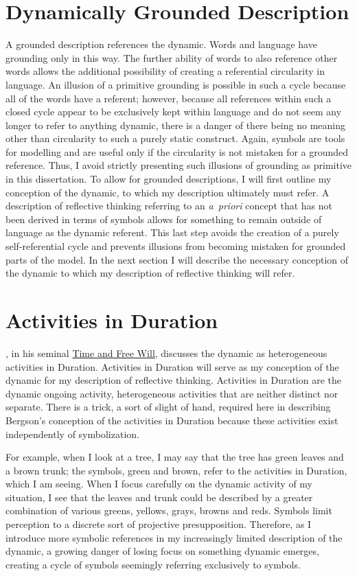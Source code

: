 \section{Dynamically Grounded Description}

A grounded description references the dynamic.  Words and language
have grounding only in this way.  The further ability of words to also
reference other words allows the additional possibility of creating a
referential circularity in language.  An illusion of a primitive
grounding is possible in such a cycle because all of the words have a
referent; however, because all references within such a closed cycle
appear to be exclusively kept within language and do not seem any
longer to refer to anything dynamic, there is a danger of there being
no meaning other than circularity to such a purely static construct.
Again, symbols are tools for modelling and are useful only if the
circularity is not mistaken for a grounded reference.  Thus, I avoid
strictly presenting such illusions of grounding as primitive in this
dissertation.  To allow for grounded descriptions, I will first
outline my conception of the dynamic, to which my description
ultimately must refer.  A description of reflective thinking referring
to an \emph{a~priori} concept that has not been derived in terms of
symbols allows for something to remain outside of language as the
dynamic referent.  This last step avoids the creation of a purely
self-referential cycle and prevents illusions from becoming mistaken
for grounded parts of the model.  In the next section I will describe
the necessary conception of the dynamic to which my description of
reflective thinking will refer.

\section{Activities in Duration}

\cite{bergson:1910}, in his seminal \underline{Time and Free Will},
discusses the dynamic as heterogeneous activities in Duration.
Activities in Duration will serve as my conception of the dynamic for
my description of reflective thinking.  Activities in Duration are the
dynamic ongoing activity, heterogeneous activities that are neither
distinct nor separate.  There is a trick, a sort of slight of hand,
required here in describing Bergson's conception of the activities in
Duration because these activities exist independently of
symbolization.

For example, when I look at a tree, I may say that the tree has green
leaves and a brown trunk; the symbols, green and brown, refer to the
activities in Duration, which I am seeing.  When I focus carefully on
the dynamic activity of my situation, I see that the leaves and trunk
could be described by a greater combination of various greens,
yellows, grays, browns and reds.  Symbols limit perception to a
discrete sort of projective presupposition.  Therefore, as I introduce
more symbolic references in my increasingly limited description of the
dynamic, a growing danger of losing focus on something dynamic
emerges, creating a cycle of symbols seemingly referring exclusively
to symbols.

